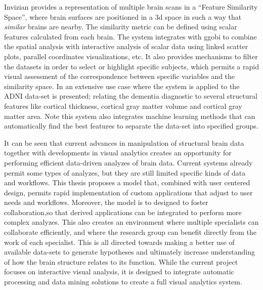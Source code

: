 Invizian \autocite{bowman_query-based_2011, bowman_visual_2012, van_horn_graphical_2013} provides a representation of multiple brain scans in a ``Feature Similarity Space'', where brain surfaces are positioned in a 3d space in such a way that \emph{similar} brains are nearby. The similarity metric can be defined using scalar features calculated from each brain. The system integrates with ggobi to combine the spatial analysis with interactive analysis of scalar data using linked scatter plots, parallel coordinates visualizations, etc. It also provides mechanisms to filter the datasets in order to select or highlight specific subjects, which permits a rapid visual assessment of the correspondence between specific variables and the similarity space.  In \autocite{van_horn_graphical_2014} an extensive use case where the system is applied to the ADNI data-set is presented; relating the dementia diagnostic to several structural features like cortical thickness, cortical gray matter volume and cortical gray matter area. Note this system also integrates machine learning methods that can automatically find the best features to separate the data-set into specified groups. 

\bigskip
It can be seen that current advances in manipulation of structural brain data together with developments in visual analytics creates an opportunity for performing efficient data-driven analyzes of brain data. Current systems already permit some types of analyzes, but they are still limited specific kinds of data and workflows. This thesis proposes a model that, combined with user centered design, permits rapid implementation of custom applications that adjust to user needs and workflows. Moreover, the model is to designed to foster collaboration,so that derived applications can be integrated to perform more complex analyzes. This also creates an environment where multiple specialists can collaborate  efficiently, and where the research group can benefit directly from the work of each specialist. This is all directed towards making a better use of available data-sets to generate hypotheses and ultimately increase understanding of how the brain structure relates to its function. While the current project focuses on interactive visual analysis, it is designed to integrate automatic processing and data mining solutions to create a full visual analytics system.